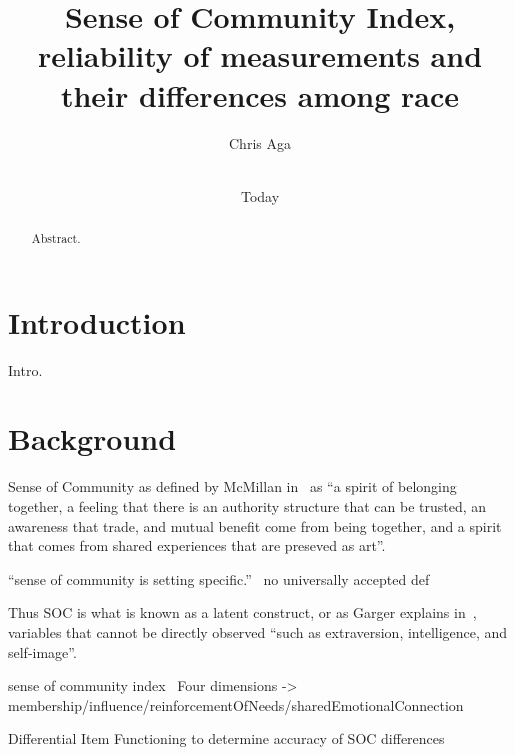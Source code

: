 \documentclass{sig-alternate}
\begin{document}
\title{Sense of Community Index, reliability of measurements and their differences among race}
\author{
\alignauthor
Chris Aga \\
 \\
}

\date{Today}

\maketitle


\begin{abstract}
Abstract.
\end{abstract}

\keywords{}

\section{Introduction}
Intro.


\section{Background}

Sense of Community as defined by McMillan in~\cite{senseOfCommunity:1996} as ``a spirit of belonging together, a feeling that there is an authority structure that can be trusted, an awareness that trade, and mutual benefit come from being together, and a spirit that comes from shared experiences that are preseved as art''.




``sense of
community is setting specific.''~\cite{cognitiveLearning:2002}
no universally accepted def

Thus SOC is what is known as a latent construct, or as Garger explains in~\cite{latent:2011}, variables that cannot be directly observed ``such as extraversion, intelligence, and self-image''.

sense of community index~\cite{disparities:2009}
Four dimensions -> membership/influence/reinforcementOfNeeds/sharedEmotionalConnection

Differential Item Functioning to determine accuracy of SOC differences
\end{document}
